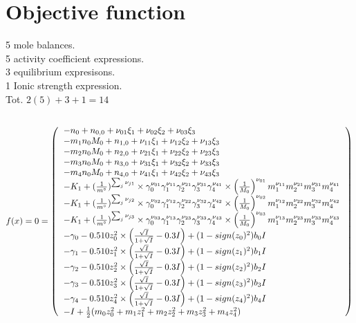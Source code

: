 \documentclass[onecolumn]{article}
\begin{document}
\section{Objective function}
5 mole balances. \\
5 activity coefficient expressions. \\
3 equilibrium expresisons. \\
1 Ionic strength expression. \\
Tot. $2(5) + 3 + 1 = 14$\\
\\
\[
f(x) = 0 = \left(
\begin{tabular}{l}
$-n_0 + n_{0,0} + \nu_{01}\xi_1 + \nu_{02}\xi_2 + \nu_{03}\xi_3  $\\
$-m_1 n_0 M_0 + n_{1,0} + \nu_{11}\xi_1 + \nu_{12}\xi_2 + \nu_{13}\xi_3  $\\
$-m_2 n_0 M_0 + n_{2,0} + \nu_{21}\xi_1 + \nu_{22}\xi_2 + \nu_{23}\xi_3  $\\
$-m_3 n_0 M_0 + n_{3,0} + \nu_{31}\xi_1 + \nu_{32}\xi_2 + \nu_{33}\xi_3  $\\
$-m_4 n_0 M_0 + n_{4,0} + \nu_{41}\xi_1 + \nu_{42}\xi_2 + \nu_{43}\xi_3  $\\
$-K_1 + (\frac{1}{m^{\circ}})^{\sum_j{\nu_{j1}}}\times
\gamma_0^{\nu_{01}}\gamma_1^{\nu_{11}}\gamma_2^{\nu_{21}}
\gamma_3^{\nu_{31}}\gamma_4^{\nu_{41}}\times
\left(\frac{1}{M_0}\right)^{\nu_{01}}m_1^{\nu_{11}}m_2^{\nu_{21}}
m_3^{\nu_{31}}m_4^{\nu_{41}}$\\
$-K_1 + (\frac{1}{m^{\circ}})^{\sum_j{\nu_{j2}}}\times
\gamma_0^{\nu_{02}}\gamma_1^{\nu_{12}}\gamma_2^{\nu_{22}}
\gamma_3^{\nu_{32}}\gamma_4^{\nu_{42}}\times
\left(\frac{1}{M_0}\right)^{\nu_{02}}m_1^{\nu_{12}}m_2^{\nu_{22}}
m_3^{\nu_{32}}m_4^{\nu_{42}}$\\
$-K_1 + (\frac{1}{m^{\circ}})^{\sum_j{\nu_{j3}}}\times
\gamma_0^{\nu_{03}}\gamma_1^{\nu_{13}}\gamma_2^{\nu_{23}}
\gamma_3^{\nu_{33}}\gamma_4^{\nu_{43}}\times
\left(\frac{1}{M_0}\right)^{\nu_{03}}m_1^{\nu_{13}}m_2^{\nu_{23}}
m_3^{\nu_{33}}m_4^{\nu_{43}}$\\
$-\gamma_0 - 0.510z_0^2 \times \left(\frac{\sqrt{I}}{1+\sqrt{I}}-0.3I\right)
+ (1-sign(z_0)^2)b_0 I$ \\
$-\gamma_1 - 0.510z_1^2 \times \left(\frac{\sqrt{I}}{1+\sqrt{I}}-0.3I\right)
+ (1-sign(z_1)^2)b_1 I$ \\
$-\gamma_2 - 0.510z_2^2 \times \left(\frac{\sqrt{I}}{1+\sqrt{I}}-0.3I\right)
+ (1-sign(z_2)^2)b_2 I$ \\
$-\gamma_3 - 0.510z_3^2 \times \left(\frac{\sqrt{I}}{1+\sqrt{I}}-0.3I\right)
+ (1-sign(z_3)^2)b_3 I$ \\
$-\gamma_4 - 0.510z_4^2 \times \left(\frac{\sqrt{I}}{1+\sqrt{I}}-0.3I\right)
+ (1-sign(z_4)^2)b_4 I$ \\
$-I + \frac{1}{2}(m_0 z_0^2 +  m_1 z_1^2 + m_2 z_2^2 + m_3 z_3^2 + m_4 z_4^2)$
\end{tabular}
\right)
\]
\end{document}
